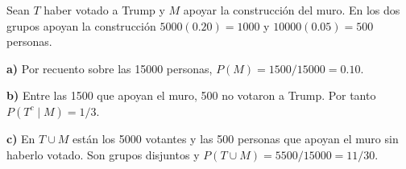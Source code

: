 Sean $T$ haber votado a Trump y $M$ apoyar la construcción
del muro. En los dos grupos apoyan la construcción
$5000(0.20)=1000$ y $10000(0.05)=500$ personas.

\textbf{a)} Por recuento sobre las 15000 personas,
$P(M)=1500/15000=\boxed{0.10}$.

\textbf{b)} Entre las 1500 que apoyan el muro, 500 no votaron
a Trump. Por tanto $P(T^c\mid M)=\boxed{1/3}$.

\textbf{c)} En $T\cup M$ están los 5000 votantes y las 500 personas
que apoyan el muro sin haberlo votado. Son grupos disjuntos y
$P(T\cup M)=5500/15000=\boxed{11/30}$.

